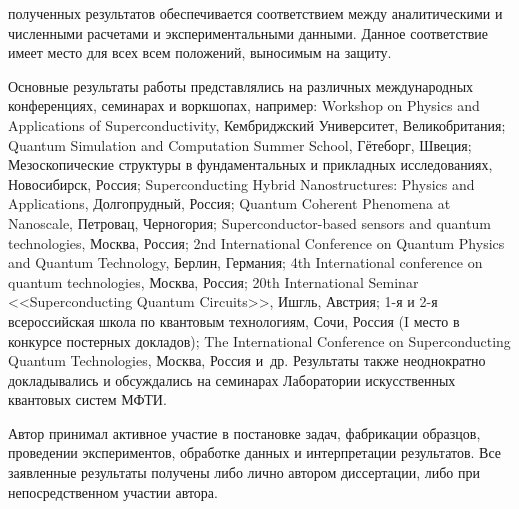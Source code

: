 {\reliability} полученных результатов обеспечивается соответствием между аналитическими и численными расчетами и экспериментальными данными. Данное соответствие имеет место для всех всем положений, выносимым на защиту. 

{\probation}
Основные результаты работы представлялись на различных международных конференциях, семинарах и воркшопах, например: Workshop on Physics and Applications of Superconductivity, Кембриджский Университет, Великобритания; Quantum Simulation and Computation Summer School, Гётеборг, Швеция;  Мезоскопические структуры в  фундаментальных и прикладных исследованиях, Новосибирск, Россия; Superconducting Hybrid Nanostructures: Physics and Applications, Долгопрудный, Россия; Quantum Coherent Phenomena at Nanoscale, Петровац, Черногория; Superconductor-based sensors and quantum technologies, Москва, Россия; 2nd International Conference on Quantum Physics and Quantum Technology, Берлин, Германия; 4th International conference on quantum technologies, Москва, Россия; 20th International Seminar <<Superconducting Quantum Circuits>>, Ишгль, Австрия; 1-я и 2-я всероссийская школа по квантовым технологиям, Сочи, Россия (I место в конкурсе постерных докладов); The International Conference on Superconducting Quantum Technologies, Москва, Россия и~др. Результаты также неоднократно докладывались и обсуждались на семинарах Лаборатории искусственных квантовых систем МФТИ.


{\contribution} Автор принимал активное участие в постановке задач, фабрикации образцов, проведении экспериментов, обработке данных и интерпретации результатов. Все заявленные результаты получены либо лично автором диссертации, либо при непосредственном участии автора.


